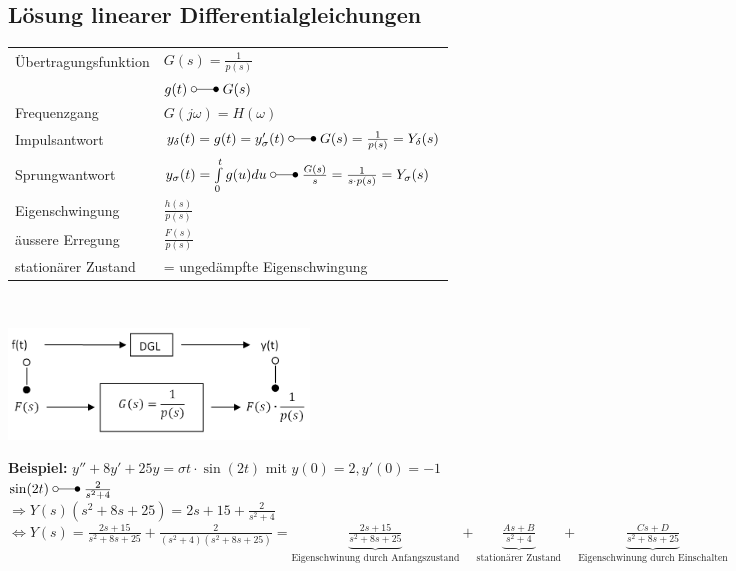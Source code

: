 	\subsection{Lösung linearer Differentialgleichungen}
		\begin{minipage}{11.5cm}
			\renewcommand{\arraystretch}{2}
			\begin{tabular}{| l | l |}
				\hline
					Übertragungsfunktion & $G(s) = \frac{1}{p(s)}$\\
					& $g(t) \; \laplace \; G(s)$ \\
				\hline
					Frequenzgang & $G(j\omega) = H(\omega)$ \\
				\hline
					Impulsantwort & $y_{\delta}(t) = g(t) = y_{\sigma}'(t) \; \laplace \; G(s) = \frac{1}{p(s)}=Y_{\delta}(s)$\\
				\hline
					Sprungwantwort & $y_{\sigma}(t)=\int\limits_0^t g(u) du \; \laplace \; \frac{G(s)}{s} = \frac{1}{s \cdot p(s)} = Y_{\sigma}(s)$\\
				\hline
					Eigenschwingung & $\frac{h(s)}{p(s)}$ \\
				\hline
					äussere Erregung & $\frac{F(s)}{p(s)}$ \\
				\hline
					stationärer Zustand & = ungedämpfte Eigenschwingung\\
				\hline
			\end{tabular}
			\renewcommand{\arraystretch}{\arraystretchOriginal}\\
		\end{minipage}
		\begin{minipage}{8cm}
					\includegraphics[width=8cm]{./bilder/diffgleichungen2.png} \\
		\end{minipage}
		
		
		\begin{minipage}[l]{16cm}
				\textbf{Beispiel:} $y'' + 8y' + 25y = \sigma{t} \cdot \sin(2t)$ mit $y(0) = 2, y'(0) = -1$\\
				
				$\sin(2t) \; \laplace \; \frac{2}{s^2+4}$ \\
				
				$\Rightarrow Y(s)(s^2+8s+25) = 2s+15+\frac{2}{s^2+4}$\\
				
				$\Leftrightarrow Y(s) = \frac{2s+15}{s^2+8s+25}+\frac{2}{(s^2+4)(s^2+8s+25)}=
				\underbrace{\frac{2s+15}{s^2+8s+25}}_\text{Eigenschwinung durch Anfangszustand} +
				\underbrace{\frac{As + B}{s^2+4}}_\text{stationärer Zustand} +
				\underbrace{\frac{Cs + D}{s^2+8s+25}}_\text{Eigenschwinung durch Einschalten}$
		\end{minipage}
		
